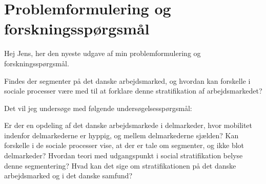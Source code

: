 \chapter{Problemformulering og forskningsspørgsmål}

Hej Jens, her den nyeste udgave af min problemformulering og forskningsspørgsmål. 

%
\vspace{\baselineskip}
%
\begin{tcolorbox}[title=\textbf{Problemformulering}]
Findes der segmenter på det danske arbejdsmarked, og hvordan kan forskelle i sociale processer være med til at forklare denne stratifikation af arbejdsmarkedet?
\end{tcolorbox}
%
\vspace{\baselineskip}
Det vil jeg undersøge med følgende undersøgelsesspørgsmål:
\vspace{\baselineskip}
\begin{tcolorbox}[title=Forskningspørgsmål,
subtitle style={boxrule=0.4pt} ]
Er der en opdeling af det danske arbejdsmarkede i delmarkeder, hvor mobilitet indenfor delmarkederne er hyppig, og mellem delmarkederne sjælden?
Kan forskelle i de sociale processer vise, at der er tale om segmenter, og ikke blot delmarkeder?
Hvordan teori med udgangspunkt i social stratifikation belyse denne segmentering? Hvad kan det sige om stratifikationen på det danske arbejdsmarked og i det danske samfund?
\end{tcolorbox}